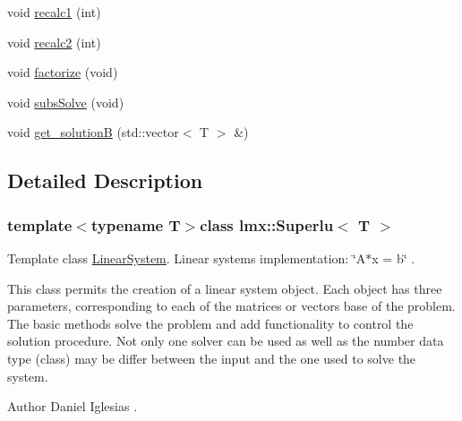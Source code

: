 \begin{DoxyCompactItemize}
\item 
void \hyperlink{classlmx_1_1Superlu_ae2e382f67055727a58919e43e27055f0}{recalc1} (int)
\item 
void \hyperlink{classlmx_1_1Superlu_a2c3ec43812db1c7c2d9d09a0a41c9885}{recalc2} (int)
\item 
void \hyperlink{classlmx_1_1Superlu_a24cc99c5023690b19e4512592153b0cf}{factorize} (void)
\item 
void \hyperlink{classlmx_1_1Superlu_a2bf4d209e3e5033f5e442289dc5cdb2a}{subs\-Solve} (void)
\item 
void \hyperlink{classlmx_1_1Superlu_ac5c29cc525a8deed07172d8950f9b95c}{get\-\_\-solution\-B} (std\-::vector$<$ T $>$ \&)
\end{DoxyCompactItemize}


\subsection{Detailed Description}
\subsubsection*{template$<$typename T$>$class lmx\-::\-Superlu$<$ T $>$}

Template class \hyperlink{classlmx_1_1LinearSystem}{Linear\-System}. Linear systems implementation\-: \char`\"{}\-A$\ast$x = b\char`\"{} . 

This class permits the creation of a linear system object. Each object has three parameters, corresponding to each of the matrices or vectors base of the problem. The basic methods solve the problem and add functionality to control the solution procedure. Not only one solver can be used as well as the number data type (class) may be differ between the input and the one used to solve the system.

\begin{DoxyAuthor}{Author}
Daniel Iglesias . 
\end{DoxyAuthor}


